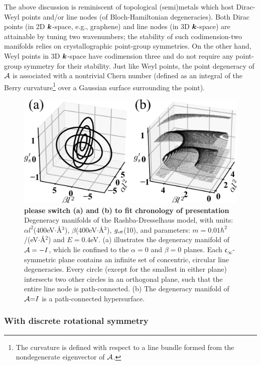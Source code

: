 \documentclass[aps, prb, showpacs, twocolumn, notitlepage, superscriptaddress]{revtex4-1}
\begin{document}
The above discussion is reminiscent of topological (semi)metals which host Dirac-Weyl points and/or line nodes (of Bloch-Hamiltonian degeneracies). Both Dirac points (in 2D $\boldsymbol{k}$-space, e.g., graphene) and  line nodes (in 3D $\boldsymbol{k}$-space) are attainable by tuning two wavenumbers; the stability of such codimension-two manifolds
 relies on crystallographic point-group symmetries. On the other hand,  Weyl points in 3D $\boldsymbol{k}$-space have codimension three and do not require any  point-group symmetry for their stability. Just like Weyl points, the point degeneracy of ${\cal A}$ is associated with a nontrivial Chern number (defined as an integral of the Berry curvature\footnote{The curvature is defined with respect to a line bundle formed from the nondegenerate eigenvector of ${\cal A}$.} over a Gaussian surface surrounding the point). 


\begin{figure}
\includegraphics[width=1.0\columnwidth]{dgn.png}
\caption{ \textbf{please switch (a) and (b) to fit chronology of presentation} Degeneracy manifolds of the Rashba-Dresselhaus model, with units: $\alpha l^2$($400$eV$\cdot$\AA$^3$), $\beta$($400$eV$\cdot$\AA$^3$), $g_{\scriptscriptstyle{\text{eff}}}$(10), and parameters: $m=0.01\hbar^2$/(eV$\cdot$\AA$^2$) and $E=0.4$eV. (a) illustrates the degeneracy manifold of ${\cal A}=-I$, which lie confined to  the $\alpha{=}0$ and $\beta{=}0$ planes. Each $\mathfrak{c}_{\infty}$-symmetric plane contains an infinite set of concentric, circular line degeneracies. Every circle (except for the smallest in either plane)  intersects two other circles in an orthogonal plane, such that the entire line node is path-connected. (b) The degeneracy manifold of ${\cal A}{=}I$ is a path-connected hypersurface.  \label{fig:dgn}}
\end{figure}

\subsubsection{With discrete rotational symmetry}
\end{document}

